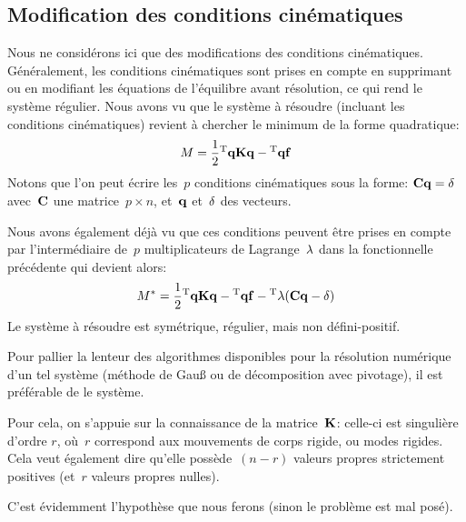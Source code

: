 \subsection{Modification des conditions cinématiques}
Nous ne considérons ici que des modifications des conditions cinématiques.
Généralement, les conditions cinématiques sont prises en compte en supprimant ou en
modifiant les équations de l'équilibre avant résolution, ce qui rend le système régulier.
Nous avons vu que le système à résoudre (incluant les conditions cinématiques) revient
à chercher le minimum de la forme quadratique:
\begin{equation}M=\frac12 \LL{q}\MM{K}\VV{q} -\LL{q}\VV{f}\end{equation}
Notons que l'on peut écrire les~$p$ conditions cinématiques sous la forme:
$\MM{C}\VV{q} = \VV{\delta}$
avec~$\MM{C}$ une matrice~$p\times n$, et~$\VV{q}$ et~$\VV{\delta}$ des vecteurs.

Nous avons également déjà vu que ces conditions peuvent être prises en compte
par l'intermédiaire de~$p$ multiplicateurs de Lagrange~$\VV{\lambda}$ dans la fonctionnelle précédente
qui devient alors:
\begin{equation}
M^*=\frac12 \LL{q}\MM{K}\VV{q} -\LL{q}\VV{f} - \LL{\lambda}(\MM{C}\VV{q} - \VV{\delta})
\end{equation}
Le système à résoudre est symétrique, régulier, mais non défini-positif.

\medskip
Pour pallier la lenteur des algorithmes disponibles pour la résolution numérique d'un tel
système (méthode de Gauß ou de décomposition avec pivotage), il est préférable
de  le système.

Pour cela, on s'appuie sur la connaissance de la matrice~$\MM{K}$: celle-ci est singulière d'ordre
$r$, où~$r$ correspond aux mouvements de corps rigide, ou modes rigides. Cela veut
également dire qu'elle possède~$(n-r)$ valeurs propres strictement positives (et~$r$ valeurs
propres nulles).

 C'est évidemment l'hypothèse que
nous ferons (sinon le problème est mal posé).

